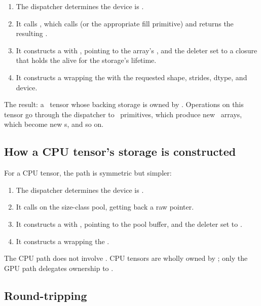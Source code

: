 \begin{enumerate}
  \item The dispatcher determines the device is .
  \item It calls , which
    calls  (or the
    appropriate fill primitive) and returns the resulting
    .
  \item It constructs a  with ,
     pointing to the array's , and the
    deleter set to a closure that holds the 
    alive for the storage's lifetime.
  \item It constructs a  wrapping the
     with the requested shape, strides, dtype, and
    device.
\end{enumerate}

The result: a \Lucid\ tensor whose backing storage is owned by
\MLX. Operations on this tensor go through the dispatcher to
\MLX\ primitives, which produce new \MLX\ arrays, which become new
s, and so on.

\subsection{How a CPU tensor's storage is constructed}
\label{ssec:tensor_model:cpu_storage}

For a CPU tensor, the path is symmetric but simpler:

\begin{enumerate}
  \item The dispatcher determines the device is .
  \item It calls  on the size-class
    pool, getting back a raw pointer.
  \item It constructs a  with ,
     pointing to the pool buffer, and the deleter set
    to .
  \item It constructs a  wrapping the
    .
\end{enumerate}

The CPU path does not involve \MLX. CPU tensors are wholly owned by
\Lucid; only the GPU path delegates ownership to \MLX.

\subsection{Round-tripping}
\label{ssec:tensor_model:round_trip}

